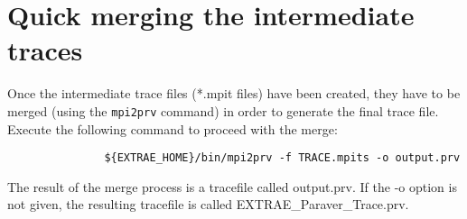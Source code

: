 \section{Quick merging the intermediate traces}

Once the intermediate trace files (*.mpit files) have been created, they have to be merged (using the {\tt mpi2prv} command) in order to generate the final \PARAVER trace file. Execute the following command to proceed with the merge:

\begin{verbatim}
               ${EXTRAE_HOME}/bin/mpi2prv -f TRACE.mpits -o output.prv
\end{verbatim}

The result of the merge process is a \PARAVER tracefile called output.prv. If the -o option is not given, the resulting tracefile is called EXTRAE\_Paraver\_Trace.prv. 

